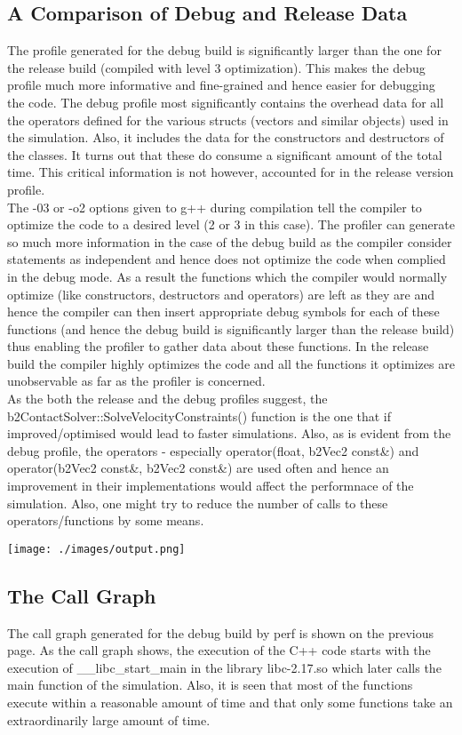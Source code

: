\documentclass[11pt]{article}
\begin{document}
\subsection{A Comparison of Debug and Release Data}
The profile generated for the debug build is significantly larger than the one for the release build (compiled with level 3 optimization). This makes the debug profile much more informative and fine-grained and hence easier for debugging the code. The debug profile most significantly contains the overhead data for all the operators defined for the various structs (vectors and similar objects) used in the simulation. Also, it includes the data for the constructors and destructors of the classes. It turns out that these do consume a significant amount of the total time. This critical information is not however, accounted for in the release version profile.
\\
\indent The -03 or -o2 options given to g++ during compilation tell the compiler to optimize the code to a desired level (2 or 3 in this case). The profiler can generate so much more information in the case of the debug build as the compiler consider statements as independent and hence does not optimize the code when complied in the debug mode. As a result the functions which the compiler would normally optimize (like constructors, destructors and operators) are left as they are and hence the compiler can then insert appropriate debug symbols for each of these functions (and hence the debug build is significantly larger than the release build) thus enabling the profiler to gather data about these functions. In the release build the compiler highly optimizes the code and all the functions it optimizes are unobservable as far as the profiler is concerned\cite{comp_optim}.
\\
\indent As the both the release and the debug profiles suggest, the b2ContactSolver::SolveVelocityConstraints() function is the one that if improved/optimised would lead to faster simulations. Also, as is evident from the debug profile, the operators - especially operator\*(float, b2Vec2 const\&) and operator\-(b2Vec2 const\&, b2Vec2 const\&) are used often and hence an improvement in their implementations would affect the performnace of the simulation. Also, one might try to reduce the number of calls to these operators/functions by some means.
\\
\begin{center}
	\texttt{[image: ./images/output.png]}
\end{center}
\subsection{The Call Graph}
The call graph generated for the debug build by perf is shown on the previous page. As the call graph shows, the execution of the C++ code starts with the execution of \_\_libc\_start\_main in the library libc-2.17.so which later calls the main function of the simulation. Also, it is seen that most of the functions execute within a reasonable amount of time and that only some functions take an extraordinarily large amount of time.



\end{document}
